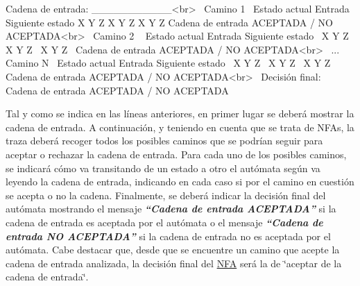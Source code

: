 \begin{DoxyPre}Cadena de entrada: \_\_\_\_\_\_\_\_\_\_\_<br>~\newline
Camino 1~\newline
Estado actual    Entrada    Siguiente estado
X                Y          Z
X                Y          Z
X                Y          Z
Cadena de entrada ACEPTADA / NO ACEPTADA<br>~\newline
Camino 2 ~\newline
Estado actual    Entrada    Siguiente estado~\newline
X                Y          Z~\newline
X                Y          Z~\newline
X                Y          Z~\newline
Cadena de entrada ACEPTADA / NO ACEPTADA<br>~\newline
...~\newline
~\newline
Camino N~\newline
Estado actual    Entrada    Siguiente estado~\newline
X                Y          Z~\newline
X                Y          Z~\newline
X                Y          Z~\newline
Cadena de entrada ACEPTADA / NO ACEPTADA<br>~\newline
Decisión final:~\newline
Cadena de entrada ACEPTADA / NO ACEPTADA~\newline
\end{DoxyPre}


Tal y como se indica en las líneas anteriores, en primer lugar se deberá mostrar la cadena de entrada. A continuación, y teniendo en cuenta que se trata de N\+F\+As, la traza deberá recoger todos los posibles caminos que se podrían seguir para aceptar o rechazar la cadena de entrada. Para cada uno de los posibles caminos, se indicará cómo va transitando de un estado a otro el autómata según va leyendo la cadena de entrada, indicando en cada caso si por el camino en cuestión se acepta o no la cadena. Finalmente, se deberá indicar la decisión final del autómata mostrando el mensaje {\itshape {\bfseries “\+Cadena de entrada A\+C\+E\+P\+T\+A\+D\+A”}} si la cadena de entrada es aceptada por el autómata o el mensaje {\itshape {\bfseries “\+Cadena de entrada NO A\+C\+E\+P\+T\+A\+D\+A”}} si la cadena de entrada no es aceptada por el autómata. Cabe destacar que, desde que se encuentre un camino que acepte la cadena de entrada analizada, la decisión final del \mbox{\hyperlink{class_n_f_a}{N\+FA}} será la de \char`\"{}aceptar de la cadena de entrada\char`\"{}.

